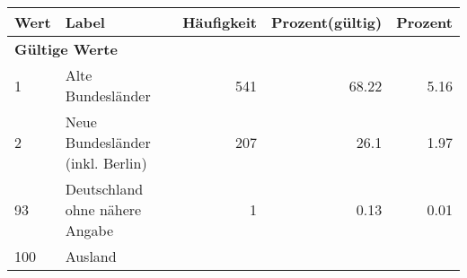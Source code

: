      \begin{longtable}{lXrrr}
     \toprule
     \textbf{Wert} & \textbf{Label} & \textbf{Häufigkeit} & \textbf{Prozent(gültig)} & \textbf{Prozent} \\
     \endhead
     \midrule
     \multicolumn{5}{l}{\textbf{Gültige Werte}}\\

     1 &
     \multicolumn{1}{X}{ Alte Bundesländer   } &


       \num{541} &
       \num[round-mode=places,round-precision=2]{68,22} &
         \num[round-mode=places,round-precision=2]{5,16} \\

     2 &
     \multicolumn{1}{X}{ Neue Bundesländer (inkl. Berlin)   } &


       \num{207} &
       \num[round-mode=places,round-precision=2]{26,1} &
         \num[round-mode=places,round-precision=2]{1,97} \\

     93 &
     \multicolumn{1}{X}{ Deutschland ohne nähere Angabe   } &


       \num{1} &
       \num[round-mode=places,round-precision=2]{0,13} &
         \num[round-mode=places,round-precision=2]{0,01} \\

     100 &
     \multicolumn{1}{X}{ Ausland   } &



\end{longtable}
